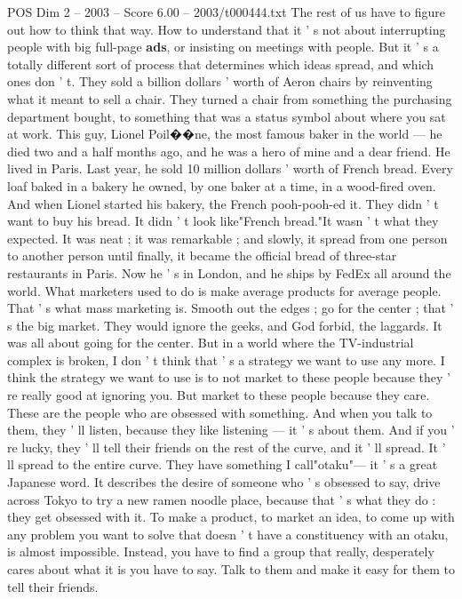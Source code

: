 \begin{textsample}{POS Dim 2 – 2003 – Score 6.00 – 2003/t000444.txt}
The rest of us have to figure out how to think that way.
How to understand that it ' s not about interrupting people with big full-page \textbf{ads}, or insisting on meetings with people.
But it ' s a totally different sort of process that determines which ideas spread, and which ones don ' t.
They sold a billion dollars ' worth of Aeron chairs by reinventing what it meant to sell a chair.
They turned a chair from something the purchasing department bought, to something that was a status symbol about where you sat at work.
This guy, Lionel Poil{\EmojiFont �}{\EmojiFont �}ne, the most famous baker in the world — he died two and a half months ago, and he was a hero of mine and a dear friend.
He lived in Paris.
Last year, he sold 10 million dollars ' worth of French bread.
Every loaf baked in a bakery he owned, by one baker at a time, in a wood-fired oven.
And when Lionel started his bakery, the French pooh-pooh-ed it.
They didn ' t want to buy his bread.
It didn ' t look like"French bread."It wasn ' t what they expected.
It was neat ; it was remarkable ; and slowly, it spread from one person to another person until finally, it became the official bread of three-star restaurants in Paris.
Now he ' s in London, and he ships by FedEx all around the world.
What marketers used to do is make average products for average people.
That ' s what mass marketing is.
Smooth out the edges ; go for the center ; that ' s the big market.
They would ignore the geeks, and God forbid, the laggards.
It was all about going for the center.
But in a world where the TV-industrial complex is broken, I don ' t think that ' s a strategy we want to use any more.
I think the strategy we want to use is to not market to these people because they ' re really good at ignoring you.
But market to these people because they care.
These are the people who are obsessed with something.
And when you talk to them, they ' ll listen, because they like listening — it ' s about them.
And if you ' re lucky, they ' ll tell their friends on the rest of the curve, and it ' ll spread.
It ' ll spread to the entire curve.
They have something I call"otaku"— it ' s a great Japanese word.
It describes the desire of someone who ' s obsessed to say, drive across Tokyo to try a new ramen noodle place, because that ' s what they do : they get obsessed with it.
To make a product, to market an idea, to come up with any problem you want to solve that doesn ' t have a constituency with an otaku, is almost impossible.
Instead, you have to find a group that really, desperately cares about what it is you have to say.
Talk to them and make it easy for them to tell their friends.

\end{textsample}
